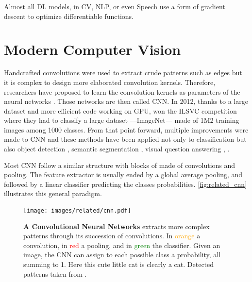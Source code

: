 Almost all \ac{DL} models, in \ac{CV}, \ac{NLP}, or even Speech use a form of gradient descent to
optimize differentiable functions.

\section{Modern Computer Vision}

Handcrafted convolutions were used to extract crude patterns such as edges \citep{lowe1999sift} but
it is complex to design more elaborated convolution kernels. Therefore, researchers have proposed to
learn the convolution kernels as parameters of the neural networks
\citep{fukushima1980neocognitron,lecun1999lenet}. Those networks are then called \ac{CNN}. In 2012,
thanks to a large dataset and more efficient code working on \acs{GPU}, \cite{krizhevsky2012alexnet}
won the ILSVC competition \citep{russakovsky2015imagenet_ilsvrc} where they had to classify a large
dataset ---ImageNet--- made of 1M2 training images among 1000 classes. From that point forward,
multiple improvements were made to \ac{CNN} \citep{ioffe2015batchnorm,he2016resnet} and these
methods have been applied not only to classification but also object detection
\citep{ren20fasterrcnn}, semantic segmentation \citep{chen2018deeplab}, visual question answering
\citep{benyounes2017mutan}, \etc.

Most \acs{CNN} follow a similar structure with blocks of made of convolutions and pooling. The
feature extractor is usually ended by a global average pooling, and followed by a linear classifier
predicting the classes probabilities. \autoref{fig:related_cnn} illustrates this general paradigm.

\begin{figure}[tb]
      \begin{center}
            \texttt{[image: images/related/cnn.pdf]}
      \end{center}
      \caption{\textbf{A Convolutional Neural Networks} extracts more complex patterns through its
            succession of convolutions. In \textcolor{orange}{orange} a convolution, in \textcolor{red}{red}
            a pooling, and in \textcolor{green}{green} the classifier. Given an image, the \ac{CNN} can assign to
            each possible class a probability, all summing to 1. Here this cute little cat is clearly a cat.
            Detected patterns taken from \cite{olah2017feature}.}
      \label{fig:related_cnn}
\end{figure}

